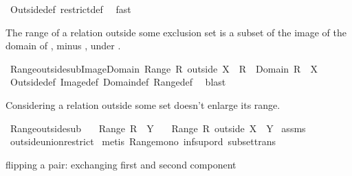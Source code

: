 \begin{isabellebody}
%
\isadelimproof
%
\endisadelimproof
%
\isatagproof
{}\isamarkupfalse%
\ Outside{\isacharunderscore}def\ restrict{\isacharunderscore}def\ \isamarkupfalse%
\ fast%
\endisatagproof
{\isafoldproof}%
%
\isadelimproof
%
\endisadelimproof
%
\begin{isamarkuptext}%
The range of a relation  outside some exclusion set  is a 
  subset of the image of the domain of , minus , under .%
\end{isamarkuptext}%
\isamarkuptrue%
\isamarkupfalse%
\ Range{\isacharunderscore}outside{\isacharunderscore}sub{\isacharunderscore}Image{\isacharunderscore}Domain{\isacharcolon}\ {\isachardoublequoteopen}Range\ {\isacharparenleft}R\ outside\ X{\isacharparenright}\ {\isasymsubseteq}\ R\ {\isacharbackquote}{\isacharbackquote}\ {\isacharparenleft}Domain\ R\ {\isacharminus}\ X{\isacharparenright}{\isachardoublequoteclose}\isanewline
%
\isadelimproof
%
\endisadelimproof
%
\isatagproof
{}\isamarkupfalse%
\ Outside{\isacharunderscore}def\ Image{\isacharunderscore}def\ Domain{\isacharunderscore}def\ Range{\isacharunderscore}def\ \isamarkupfalse%
\ blast%
\endisatagproof
{\isafoldproof}%
%
\isadelimproof
%
\endisadelimproof
%
\begin{isamarkuptext}%
Considering a relation outside some set doesn't enlarge its range.%
\end{isamarkuptext}%
\isamarkuptrue%
\isamarkupfalse%
\ Range{\isacharunderscore}outside{\isacharunderscore}sub{\isacharcolon}\isanewline
\ \ \ {\isachardoublequoteopen}Range\ R\ {\isasymsubseteq}\ Y{\isachardoublequoteclose}\isanewline
\ \ \ {\isachardoublequoteopen}Range\ {\isacharparenleft}R\ outside\ X{\isacharparenright}\ {\isasymsubseteq}\ Y{\isachardoublequoteclose}\isanewline
%
\isadelimproof
%
\endisadelimproof
%
\isatagproof
{}\isamarkupfalse%
\ assms\isanewline
{}\isamarkupfalse%
\ outside{\isacharunderscore}union{\isacharunderscore}restrict\isanewline
{}\isamarkupfalse%
\ {\isacharparenleft}metis\ Range{\isacharunderscore}mono\ inf{\isacharunderscore}sup{\isacharunderscore}ord{\isacharparenleft}{}{\isacharparenright}\ subset{\isacharunderscore}trans{\isacharparenright}%
\endisatagproof
{\isafoldproof}%
%
\isadelimproof
%
\endisadelimproof
%
\isamarkuptrue%
%
\begin{isamarkuptext}%
flipping a pair: exchanging first and second component%

\end{isamarkuptext}
\end{isabellebody}
